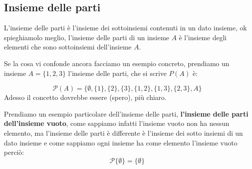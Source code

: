 \documentclass{article}
\theoremstyle{definition}
\begin{document}
\subsection{Insieme delle parti}
L'insieme delle parti è l'insieme dei sottoinsiemi contenuti in un dato insieme, ok spieghiamolo meglio, l'insieme delle parti di un insieme $A$ è l'insieme degli elementi che sono sottoinsiemi dell'insieme $A$. \par
Se la cosa vi confonde ancora facciamo un esempio concreto, prendiamo un insieme $A = \{1,2,3\}$ l'insieme delle parti, che si scrive $P(A)$ è:

\begin{equation}
        \mathcal{P}(A) = \{\emptyset, \{1\}, \{2\}, \{3\}, \{1, 2\}, \{1, 3\}, \{2, 3\}, A \}
\end{equation}
Adesso il concetto dovrebbe essere (spero), più chiaro. \newline 

Prendiamo un esempio particolare dell'insieme delle parti, \textbf{l'insieme delle parti dell'insieme vuoto}, come sappiamo infatti l'insieme vuoto non ha nessun elemento, ma l'insieme delle parti è differente è l'insieme dei sotto insiemi di un dato insieme e come sappiamo ogni insieme ha come elemento l'insieme vuoto perciò:
\begin{equation}
        \mathcal{P}\{\emptyset\} = \{\emptyset  \}
\end{equation}
\end{document}
